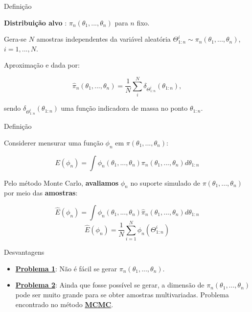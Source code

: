 \documentclass{beamer}
\begin{document}
\begin{frame}{Definição}

\textbf{Distribuição alvo} : $\pi_n(\theta_1,...,\theta_n)$ para $n$ fixo.

\pause
\vspace{0.5cm}

Gera-se $N$ amostras independentes da variável aleatória $\Theta^i_{1:n} \sim \pi_n(\theta_1,...,\theta_n)$, $i=1,...,N$.

\pause
\vspace{0.5cm}

Aproximação e dada por:

$$
\hat{\pi}_n(\theta_1,...,\theta_n) = \frac{1}{N}\sum_i^N \delta_{\Theta^i_{1:n}}(\theta_{1:n}),
$$

\vspace{0.5cm}
sendo $\delta_{\Theta_{1:n}^{i}}(\theta_{1:n})$ uma função indicadora de massa no ponto $\theta_{1:n}$.
\end{frame}



\begin{frame}{Definição}

Considerer mensurar uma função $\phi_n$ em $\pi(\theta_1,...,\theta_n)$:

$$
E(\phi_n) =  \int \phi_n(\theta_1,...,\theta_n)\pi_n(\theta_1,...,\theta_n)d\theta_{1:n}
$$
\pause

Pelo método Monte Carlo, \textbf{avaliamos}  $\phi_n$ no suporte simulado de $\pi(\theta_1,...,\theta_n)$ por meio das \textbf{amostras}:

$$
\hat{E}(\phi_n) = \int \phi_n(\theta_1,...,\theta_n)\hat{\pi}_n(\theta_1,...,\theta_n)d\theta_{1:n}
$$
\pause
$$
\hat{E}(\phi_n) = \frac{1}{N} \sum_{i=1}^N \phi_n(\Theta^i_{1:n})
$$


\end{frame}

\begin{frame}{Desvantagens}


\begin{itemize}

\item[] \underline{\textbf{Problema 1}}: Não é fácil se gerar $\pi_n(\theta_1,...,\theta_n)$. 
\pause 

\vspace{.5cm}
\item[] \underline{\textbf{Problema 2}}: Ainda que fosse possível se gerar, a dimensão de $\pi_n(\theta_1,...,\theta_n)$ pode ser muito grande para se obter amostras multivariadas. Problema encontrado no método \underline{\textbf{MCMC}}. 

\end{itemize}
\end{frame}
\end{document}
